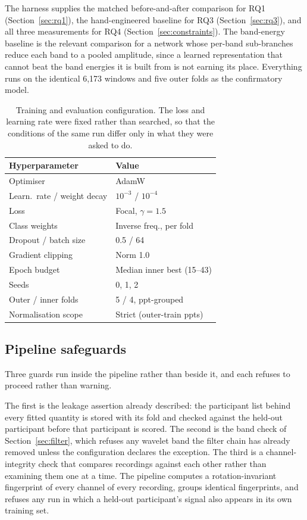 \documentclass[pdflatex,sn-nature,iicol]{sn-jnl}
\begin{document}
The harness supplies the matched before-and-after comparison for RQ1 (Section~\ref{sec:rq1}), the hand-engineered baseline for RQ3 (Section~\ref{sec:rq3}), and all three measurements for RQ4 (Section~\ref{sec:constraints}). The band-energy baseline is the relevant comparison for a network whose per-band sub-branches reduce each band to a pooled amplitude, since a learned representation that cannot beat the band energies it is built from is not earning its place. Everything runs on the identical 6,173 windows and five outer folds as the confirmatory model.

\begin{table}[t]
  \caption{Training and evaluation configuration. The loss and learning rate were fixed rather than searched, so that the conditions of the same run differ only in what they were asked to do.}
  \label{tab:hyperparameters}
  \centering
  \footnotesize
  \begin{tabular*}{\columnwidth}{@{\extracolsep{\fill}}ll@{}}
    \toprule
    Hyperparameter & Value \\
    \midrule
    Optimiser & AdamW \\
    Learn.\ rate / weight decay & $10^{-3}$ / $10^{-4}$ \\
    Loss & Focal, $\gamma = 1.5$ \\
    Class weights & Inverse freq., per fold \\
    Dropout / batch size & 0.5 / 64 \\
    Gradient clipping & Norm 1.0 \\
    Epoch budget & Median inner best (15--43) \\
    Seeds & 0, 1, 2 \\
    Outer / inner folds & 5 / 4, ppt-grouped \\
    Normalisation scope & Strict (outer-train ppts) \\
    \bottomrule
  \end{tabular*}
\end{table}

\subsection{Pipeline safeguards}
\label{sec:safeguards}

Three guards run inside the pipeline rather than beside it, and each refuses to proceed rather than warning.

The first is the leakage assertion already described: the participant list behind every fitted quantity is stored with its fold and checked against the held-out participant before that participant is scored. The second is the band check of Section~\ref{sec:filter}, which refuses any wavelet band the filter chain has already removed unless the configuration declares the exception. The third is a channel-integrity check that compares recordings against each other rather than examining them one at a time. The pipeline computes a rotation-invariant fingerprint of every channel of every recording, groups identical fingerprints, and refuses any run in which a held-out participant's signal also appears in its own training set.
\end{document}
